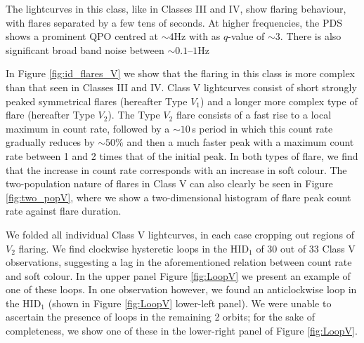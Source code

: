 \par The lightcurves in this class, like in Classes III and IV, show flaring behaviour, with flares separated by a few tens of seconds.  At higher frequencies, the PDS shows a prominent QPO centred at $\sim4$Hz with as $q$-value of $\sim3$.  There is also significant broad band noise between $\sim0.1$--$1$Hz
\par In Figure \ref{fig:id_flares_V} we show that the flaring in this class is more complex than that seen in Classes III and IV.  Class V lightcurves consist of short strongly peaked symmetrical flares (hereafter Type $V_1$) and a longer more complex type of flare (hereafter Type $V_2$).  The Type $V_2$ flare consists of a fast rise to a local maximum in count rate, followed by a $\sim10$\,s period in which this count rate gradually reduces by $\sim50\%$ and then a much faster peak with a maximum count rate between 1 and 2 times that of the initial peak.  In both types of flare, we find that the increase in count rate corresponds with an increase in soft colour.  The two-population nature of flares in Class V can also clearly be seen in Figure \ref{fig:two_popV}, where we show a two-dimensional histogram of flare peak count rate against flare duration.
\par We folded all individual Class V lightcurves, in each case cropping out regions of $V_2$ flaring.  We find clockwise hysteretic loops in the HID$_1$ of 30 out of 33 Class V observations, suggesting a lag in the aforementioned relation between count rate and soft colour.  In the upper panel Figure \ref{fig:LoopV} we present an example of one of these loops.  In one observation however, we found an anticlockwise loop in the HID$_1$ (shown in Figure \ref{fig:LoopV} lower-left panel).  We were unable to ascertain the presence of loops in the remaining 2 orbits; for the sake of completeness, we show one of these in the lower-right panel of Figure \ref{fig:LoopV}.

